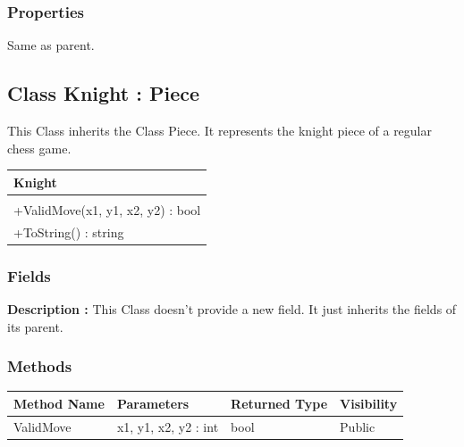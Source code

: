 \documentclass[12pt]{article}
\begin{document}
\subsubsection{Properties}

Same as parent.
\newpage


\subsection{Class Knight : Piece}

This Class inherits the Class Piece. It represents the knight 
piece of a regular chess game.
\begin{table}[H]
    \begin{tabular}{|l|}
    \hline
    \cellcolor[HTML]{C0C0C0}\textbf{Knight} \\ \hline
    \cellcolor[HTML]{EFEFEF}                    \\ \hline
    +ValidMove(x1, y1, x2, y2) : bool           \\ \hline
    +ToString() : string                        \\ \hline
    \end{tabular}
\end{table}

\subsubsection{Fields}

\textbf{Description :} This Class doesn't provide a new field. It just
inherits the fields of its parent.

\subsubsection{Methods}

\begin{table}[H]
    \begin{tabular}{|l|l|l|l|}
    \hline
    \rowcolor[HTML]{EFEFEF} 
    \cellcolor[HTML]{EFEFEF}\textbf{Method Name} & \textbf{Parameters}  & \textbf{Returned Type} & \textbf{Visibility} \\ \hline
    ValidMove                          & x1, y1, x2, y2 : int & bool                   & Public              \\ \hline
    \end{tabular}
\end{table}
\end{document}
